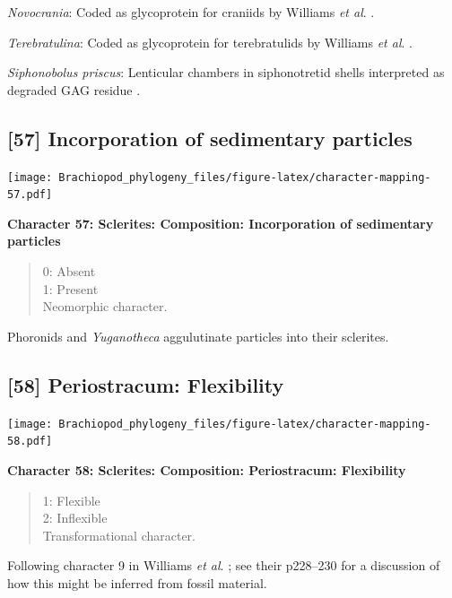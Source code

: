 \documentclass[openany]{book}
\theoremstyle{definition}
\theoremstyle{definition}
\theoremstyle{definition}
\theoremstyle{remark}
\begin{document}
\emph{Novocrania}: Coded as glycoprotein for craniids by Williams
\emph{et al}. \citeyearpar{Williams1996Asupra}.

\emph{Terebratulina}: Coded as glycoprotein for terebratulids by
Williams \emph{et al}. \citeyearpar{Williams1996Asupra}.

\emph{Siphonobolus priscus}: Lenticular chambers in siphonotretid shells
interpreted as degraded GAG residue
\citep{Williams2004Chemicostructure}.

\hypertarget{incorporation-of-sedimentary-particles}{%
\subsection*{{[}57{]} Incorporation of sedimentary
particles}\label{incorporation-of-sedimentary-particles}}

\texttt{[image: Brachiopod\_phylogeny\_files/figure-latex/character-mapping-57.pdf]}

\textbf{Character 57: Sclerites: Composition: Incorporation of
sedimentary particles}

\begin{quote}
0: Absent\\
1: Present\\
Neomorphic character.
\end{quote}

Phoronids and \emph{Yuganotheca} aggulutinate particles into their
sclerites.

\hypertarget{periostracum-flexibility}{%
\subsection*{{[}58{]} Periostracum:
Flexibility}\label{periostracum-flexibility}}

\texttt{[image: Brachiopod\_phylogeny\_files/figure-latex/character-mapping-58.pdf]}

\textbf{Character 58: Sclerites: Composition: Periostracum: Flexibility}

\begin{quote}
1: Flexible\\
2: Inflexible\\
Transformational character.
\end{quote}

Following character 9 in Williams \emph{et al}.
\citeyearpar{Williams1998Thediversity}; see their p228--230 for a
discussion of how this might be inferred from fossil material.
\end{document}
